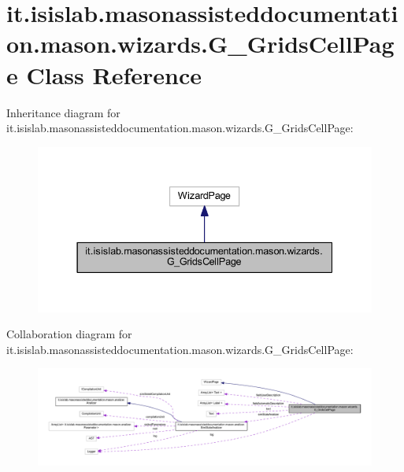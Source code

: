 \hypertarget{classit_1_1isislab_1_1masonassisteddocumentation_1_1mason_1_1wizards_1_1_g___grids_cell_page}{\section{it.\-isislab.\-masonassisteddocumentation.\-mason.\-wizards.\-G\-\_\-\-Grids\-Cell\-Page Class Reference}
\label{classit_1_1isislab_1_1masonassisteddocumentation_1_1mason_1_1wizards_1_1_g___grids_cell_page}
}


Inheritance diagram for it.\-isislab.\-masonassisteddocumentation.\-mason.\-wizards.\-G\-\_\-\-Grids\-Cell\-Page\-:
\nopagebreak
\begin{figure}[H]
\begin{center}
\leavevmode
\includegraphics[width=337pt]{classit_1_1isislab_1_1masonassisteddocumentation_1_1mason_1_1wizards_1_1_g___grids_cell_page__inherit__graph}
\end{center}
\end{figure}


Collaboration diagram for it.\-isislab.\-masonassisteddocumentation.\-mason.\-wizards.\-G\-\_\-\-Grids\-Cell\-Page\-:
\nopagebreak
\begin{figure}[H]
\begin{center}
\leavevmode
\includegraphics[width=350pt]{classit_1_1isislab_1_1masonassisteddocumentation_1_1mason_1_1wizards_1_1_g___grids_cell_page__coll__graph}
\end{center}
\end{figure}
